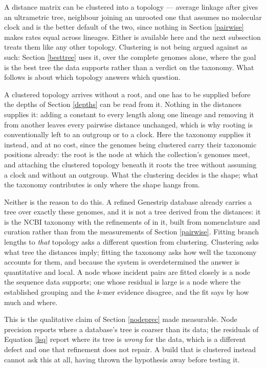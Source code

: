 \documentclass[pdflatex,sn-vancouver-num]{sn-jnl}
\begin{document}
A distance matrix can be clustered into a topology --- average linkage after \cite{Sokal1958ASM}
gives an ultrametric tree, neighbour joining \cite{saitou1987nj} an unrooted one that assumes no
molecular clock and is the better default of the two, since nothing in Section \ref{pairwise} makes
rates equal across lineages. Either is available here and the next subsection treats them like any
other topology. Clustering is not being argued against as such: Section \ref{besttree} uses it, over
the complete genomes alone, where the goal is the best tree the data supports rather than a verdict on
the taxonomy. What follows is about which topology answers which question.

A clustered topology arrives without a root, and one has to be supplied before the depths of
Section \ref{depths} can be read from it. Nothing in the distances supplies it: adding a constant to
every length along one lineage and removing it from another leaves every pairwise distance unchanged,
which is why rooting is conventionally left to an outgroup or to a clock. Here the taxonomy supplies
it instead, and at no cost, since the genomes being clustered carry their taxonomic positions
already: the root is the node at which the collection's genomes meet, and attaching the clustered
topology beneath it roots the tree without assuming a clock and without an outgroup. What the
clustering decides is the shape; what the taxonomy contributes is only where the shape hangs from.

Neither is the reason to do this. A refined Genestrip database already carries a tree over exactly
these genomes, and it is not a tree derived from the distances: it is the NCBI taxonomy
\cite{taxonomy} with the refinements of \cite{genestrip-ft} in it, built from nomenclature and
curation rather than from the measurements of Section \ref{pairwise}. Fitting branch lengths to
\emph{that} topology asks a different question from clustering. Clustering asks what tree the
distances imply; fitting the taxonomy asks how well the taxonomy accounts for them, and because the
system is overdetermined the answer is quantitative and local. A node whose incident pairs are fitted
closely is a node the sequence data supports; one whose residual is large is a node where the
established grouping and the $k$-mer evidence disagree, and the fit says by how much and where.

This is the qualitative claim of Section \ref{nodeprec} made measurable. Node precision reports
where a database's tree is coarser than its data; the residuals of Equation \eqref{lsq} report where
its tree is \emph{wrong} for the data, which is a different defect and one that refinement does not
repair. A build that is clustered instead cannot ask this at all, having thrown the hypothesis away
before testing it.
\end{document}
